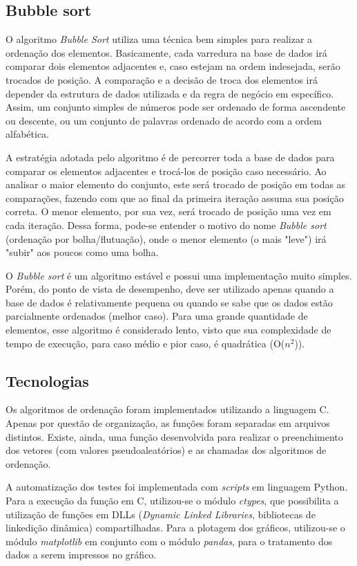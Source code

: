 \documentclass[12pt]{article}
\begin{document}
\subsection{Bubble sort}

O algoritmo \textit{Bubble Sort} utiliza uma técnica bem simples para realizar a ordenação dos elementos. Basicamente, cada varredura na base de dados irá comparar dois elementos adjacentes e, caso estejam na ordem indesejada, serão trocados de posição. A comparação e a decisão de troca dos elementos irá depender da estrutura de dados utilizada e da regra de negócio em específico. Assim, um conjunto simples de números pode ser ordenado de forma ascendente ou descente, ou um conjunto de palavras ordenado de acordo com a ordem alfabética. \cite{bubble:jairo}

A estratégia adotada pelo algoritmo é de percorrer toda a base de dados para comparar os elementos adjacentes e trocá-los de posição caso necessário. Ao analisar o maior elemento do conjunto, este será trocado de posição em todas as comparações, fazendo com que ao final da primeira iteração assuma sua posição correta. O menor elemento, por sua vez, será trocado de posição uma vez em cada iteração. Dessa forma, pode-se entender o motivo do nome \textit{Bubble sort} (ordenação por bolha/flutuação), onde o menor elemento (o mais "leve") irá "subir" aos poucos como uma bolha. 

O \textit{Bubble sort} é um algoritmo estável e possui uma implementação muito simples. Porém, do ponto de vista de desempenho, deve ser utilizado apenas quando a base de dados é relativamente pequena ou quando se sabe que os dados estão parcialmente ordenados (melhor caso). Para uma grande quantidade de elementos, esse algoritmo é considerado lento, visto que sua complexidade de tempo de execução, para caso médio e pior caso, é quadrática (O($n^2$)). \cite{bubble:jairo} 

\subsection{Tecnologias}

Os algoritmos de ordenação foram implementados utilizando a linguagem C. Apenas por questão de organização, as funções foram separadas em arquivos distintos. Existe, ainda, uma função desenvolvida para realizar o preenchimento dos vetores (com valores pseudoaleatórios) e as chamadas dos algoritmos de ordenação.

A automatização dos testes foi implementada com \textit{scripts} em linguagem Python. Para a execução da função em C, utilizou-se o módulo \textit{ctypes}, que possibilita a utilização de funções em DLLs (\textit{Dynamic Linked Libraries}, bibliotecas de linkedição dinâmica) compartilhadas. Para a plotagem dos gráficos, utilizou-se o módulo \textit{matplotlib} em conjunto com o módulo \textit{pandas}, para o tratamento dos dados a serem impressos no gráfico.
\end{document}
